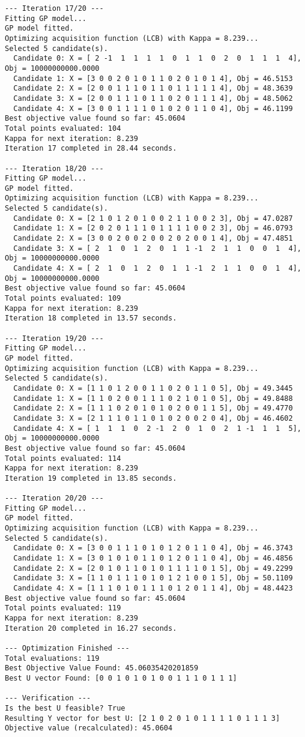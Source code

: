 \documentclass[
  letterpaper,
  DIV=11,
  numbers=noendperiod]{scrartcl}
\begin{document}
\begin{verbatim}
--- Iteration 17/20 ---
Fitting GP model...
GP model fitted.
Optimizing acquisition function (LCB) with Kappa = 8.239...
Selected 5 candidate(s).
  Candidate 0: X = [ 2 -1  1  1  1  1  0  1  1  0  2  0  1  1  1  4], Obj = 10000000000.0000
  Candidate 1: X = [3 0 0 2 0 1 0 1 1 0 2 0 1 0 1 4], Obj = 46.5153
  Candidate 2: X = [2 0 0 1 1 1 0 1 1 0 1 1 1 1 1 4], Obj = 48.3639
  Candidate 3: X = [2 0 0 1 1 1 0 1 1 0 2 0 1 1 1 4], Obj = 48.5062
  Candidate 4: X = [3 0 0 1 1 1 1 0 1 0 2 0 1 1 0 4], Obj = 46.1199
Best objective value found so far: 45.0604
Total points evaluated: 104
Kappa for next iteration: 8.239
Iteration 17 completed in 28.44 seconds.

--- Iteration 18/20 ---
Fitting GP model...
GP model fitted.
Optimizing acquisition function (LCB) with Kappa = 8.239...
Selected 5 candidate(s).
  Candidate 0: X = [2 1 0 1 2 0 1 0 0 2 1 1 0 0 2 3], Obj = 47.0287
  Candidate 1: X = [2 0 2 0 1 1 1 0 1 1 1 1 0 0 2 3], Obj = 46.0793
  Candidate 2: X = [3 0 0 2 0 0 2 0 0 2 0 2 0 0 1 4], Obj = 47.4851
  Candidate 3: X = [ 2  1  0  1  2  0  1  1 -1  2  1  1  0  0  1  4], Obj = 10000000000.0000
  Candidate 4: X = [ 2  1  0  1  2  0  1  1 -1  2  1  1  0  0  1  4], Obj = 10000000000.0000
Best objective value found so far: 45.0604
Total points evaluated: 109
Kappa for next iteration: 8.239
Iteration 18 completed in 13.57 seconds.

--- Iteration 19/20 ---
Fitting GP model...
GP model fitted.
Optimizing acquisition function (LCB) with Kappa = 8.239...
Selected 5 candidate(s).
  Candidate 0: X = [1 1 0 1 2 0 0 1 1 0 2 0 1 1 0 5], Obj = 49.3445
  Candidate 1: X = [1 1 0 2 0 0 1 1 1 0 2 1 0 1 0 5], Obj = 49.8488
  Candidate 2: X = [1 1 1 0 2 0 1 0 1 0 2 0 0 1 1 5], Obj = 49.4770
  Candidate 3: X = [2 1 1 1 0 1 1 0 1 0 2 0 0 2 0 4], Obj = 46.4602
  Candidate 4: X = [ 1  1  1  0  2 -1  2  0  1  0  2  1 -1  1  1  5], Obj = 10000000000.0000
Best objective value found so far: 45.0604
Total points evaluated: 114
Kappa for next iteration: 8.239
Iteration 19 completed in 13.85 seconds.

--- Iteration 20/20 ---
Fitting GP model...
GP model fitted.
Optimizing acquisition function (LCB) with Kappa = 8.239...
Selected 5 candidate(s).
  Candidate 0: X = [3 0 0 1 1 1 0 1 0 1 2 0 1 1 0 4], Obj = 46.3743
  Candidate 1: X = [3 0 1 0 1 0 1 1 0 1 2 0 1 1 0 4], Obj = 46.4856
  Candidate 2: X = [2 0 1 0 1 1 0 1 0 1 1 1 1 0 1 5], Obj = 49.2299
  Candidate 3: X = [1 1 0 1 1 1 0 1 0 1 2 1 0 0 1 5], Obj = 50.1109
  Candidate 4: X = [1 1 1 0 1 0 1 1 1 0 1 2 0 1 1 4], Obj = 48.4423
Best objective value found so far: 45.0604
Total points evaluated: 119
Kappa for next iteration: 8.239
Iteration 20 completed in 16.27 seconds.

--- Optimization Finished ---
Total evaluations: 119
Best Objective Value Found: 45.06035420201859
Best U vector Found: [0 0 1 0 1 0 1 0 0 1 1 1 0 1 1 1]

--- Verification ---
Is the best U feasible? True
Resulting Y vector for best U: [2 1 0 2 0 1 0 1 1 1 1 0 1 1 1 3]
Objective value (recalculated): 45.0604
\end{verbatim}
\end{document}
